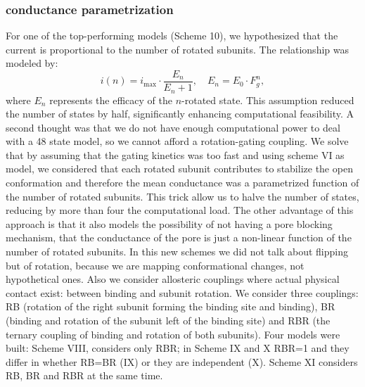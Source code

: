 \documentclass[pdflatex,sn-mathphys-num]{sn-jnl}%
\theoremstyle{thmstyleone}%
\theoremstyle{thmstyletwo}%
\theoremstyle{thmstylethree}%
\begin{document}
\subsubsection{conductance parametrization}
For one of the top-performing models (Scheme 10), we hypothesized that the current is proportional to the number of rotated subunits. The relationship was modeled by:
\[
i(n) = i_{\text{max}} \cdot \frac{E_n}{E_n + 1}, \quad E_n = E_0 \cdot F_g^n,
\]
where \( E_n \) represents the efficacy of the \( n \)-rotated state. This assumption reduced the number of states by half, significantly enhancing computational feasibility.
A second thought was that we do not have enough computational power to deal with a 48 state model, so we cannot afford a rotation-gating coupling. 
We solve that by assuming that the gating kinetics was too fast and using scheme VI as model, we considered that each rotated subunit contributes to stabilize the open conformation and therefore the mean conductance was a parametrized function of the number of rotated subunits. This trick allow us to halve the number of states, reducing by more than four the computational load. The other advantage of this approach is that it also models the possibility of not having a pore blocking mechanism, that the conductance of the pore is just a non-linear function of the number of rotated subunits. 
In this new schemes we did not talk about flipping but of rotation, because we are mapping conformational changes, not hypothetical ones. Also we  consider allosteric couplings where actual physical contact exist: between  binding and subunit rotation. We consider three couplings: RB (rotation of the right subunit forming the binding site and binding), BR (binding and rotation of the subunit left of the binding site) and RBR (the ternary coupling of binding and rotation of both subunits). 
Four models were built: Scheme VIII, considers only RBR; in Scheme IX and X RBR=1 and they differ in whether RB=BR (IX) or they are independent (X). Scheme XI considers RB, BR and RBR  at the same time. 
\end{document}
